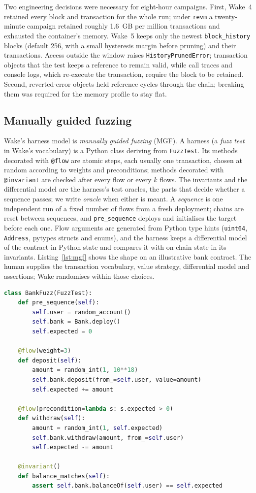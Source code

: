 \documentclass[11pt,a4paper]{article}
\newcommand{\wake}{Wake}
\newcommand{\revm}{\texttt{revm}}
\begin{document}
Two engineering decisions were necessary for eight-hour campaigns. First, \wake{}~4 retained every block and transaction for the whole run; under \revm{} a twenty-minute campaign retained roughly 1.6~GB per million transactions and exhausted the container's memory. \wake{}~5 keeps only the newest \texttt{block\_history} blocks (default 256, with a small hysteresis margin before pruning) and their transactions. Access outside the window raises \texttt{HistoryPrunedError}; transaction objects that the test keeps a reference to remain valid, while call traces and console logs, which re-execute the transaction, require the block to be retained. Second, reverted-error objects held reference cycles through the chain; breaking them was required for the memory profile to stay flat.

\subsection{Manually guided fuzzing}
\label{sec:mgf}

\wake{}'s harness model is \emph{manually guided fuzzing} (MGF). A harness (a \emph{fuzz test} in \wake{}'s vocabulary) is a Python class deriving from \texttt{FuzzTest}. Its methods decorated with \texttt{@flow} are atomic steps, each usually one transaction, chosen at random according to weights and preconditions; methods decorated with \texttt{@invariant} are checked after every flow or every $k$ flows. The invariants and the differential model are the harness's test oracles, the parts that decide whether a sequence passes; we write \emph{oracle} when either is meant. A \emph{sequence} is one independent run of a fixed number of flows from a fresh deployment; chains are reset between sequences, and \texttt{pre\_sequence} deploys and initialises the target before each one. Flow arguments are generated from Python type hints (\texttt{uint64}, \texttt{Address}, pytypes structs and enums), and the harness keeps a differential model of the contract in Python state and compares it with on-chain state in its invariants. Listing~\ref{lst:mgf} shows the shape on an illustrative bank contract. The human supplies the transaction vocabulary, value strategy, differential model and assertions; \wake{} randomises within those choices.

\begin{lstlisting}[language=Python,caption={Manually guided fuzz test for a bank contract.},label={lst:mgf}]
class BankFuzz(FuzzTest):
    def pre_sequence(self):
        self.user = random_account()
        self.bank = Bank.deploy()
        self.expected = 0

    @flow(weight=3)
    def deposit(self):
        amount = random_int(1, 10**18)
        self.bank.deposit(from_=self.user, value=amount)
        self.expected += amount

    @flow(precondition=lambda s: s.expected > 0)
    def withdraw(self):
        amount = random_int(1, self.expected)
        self.bank.withdraw(amount, from_=self.user)
        self.expected -= amount

    @invariant()
    def balance_matches(self):
        assert self.bank.balanceOf(self.user) == self.expected
\end{lstlisting}
\end{document}
